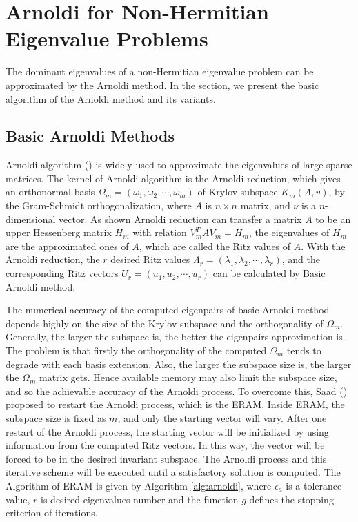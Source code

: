 \section{Arnoldi for Non-Hermitian Eigenvalue Problems}

The dominant eigenvalues of a non-Hermitian eigenvalue problem can be approximated by the Arnoldi method. In the section, we present the basic algorithm of the Arnoldi method and its variants.

\subsection{Basic Arnoldi Methods}
Arnoldi algorithm (\cite{arnoldi1951principle}) is widely used to approximate the eigenvalues of large sparse matrices. The kernel of Arnoldi algorithm is the Arnoldi reduction, which gives an orthonormal basis \(\Omega_m = (\omega_1,\omega_2,\cdots,\omega_m)\) of Krylov subspace \(K_m(A,v)\), by the Gram-Schmidt orthogonalization, where \(A\) is  \(n \times n\) matrix, and $\nu$ is a \(n\)-dimensional vector. As shown Arnoldi reduction can transfer a matrix \(A\) to be an upper Hessenberg matrix \(H_m\) with relation $V_m^T A V_m = H_m$, the eigenvalues of \(H_m\) are the approximated ones of \(A\), which are called the Ritz values of \(A\). With the Arnoldi reduction, the $r$ desired Ritz values $\Lambda_r=(\lambda_1,\lambda_2,\cdots,\lambda_r)$, and the corresponding Ritz vectors $U_r=(u_1,u_2,\cdots,u_r)$ can be calculated by Basic Arnoldi method.

The numerical accuracy of the computed eigenpairs of basic Arnoldi method depends highly on the size of the Krylov subspace and the orthogonality of $\Omega_m$. Generally, the larger the subspace is, the better the eigenpairs approximation is. The problem is that firstly the orthogonality of the computed $\Omega_m$ tends to degrade with each basis extension. Also, the larger the subspace size is, the larger the $\Omega_m$ matrix gets. Hence available memory may also limit the subspace size, and so the achievable accuracy of the Arnoldi process. To overcome this, Saad (\cite{saad2011numerical}) proposed to restart the Arnoldi process, which is the ERAM. Inside ERAM, the subspace size is fixed as $m$, and only the starting vector will vary. After one restart of the Arnoldi process, the starting vector will be initialized by using information from the computed Ritz vectors. In this way, the vector will be forced to be in the desired invariant subspace. The Arnoldi process and this iterative scheme will be executed until a satisfactory solution is computed. The Algorithm of ERAM is given by Algorithm \ref{alg:arnoldi}, where $\epsilon_a$ is a tolerance value, $r$ is desired eigenvalues number and the function $g$ defines the stopping criterion of iterations.

